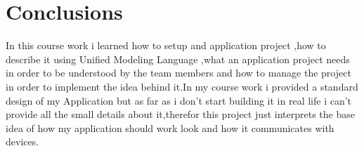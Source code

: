 \section*{Conclusions}
In this course work i learned how to setup and application project ,how to describe it using Unified Modeling Language ,what an application project needs in order to be understood by the team members and how to manage the project in order to implement the idea behind it.In my course work i provided a standard design of my Application but as far as i don't start building it in real life i can't provide all the small details about it,therefor this project just interprets the base idea of how my application should work look and how it communicates with devices.
\clearpage